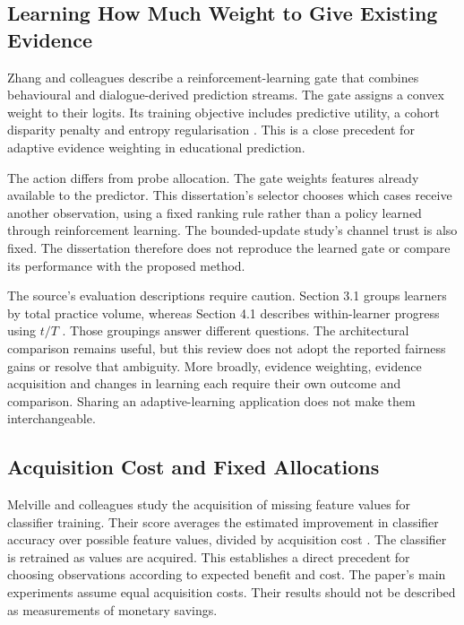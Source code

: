 \subsection{Learning How Much Weight to Give Existing Evidence}

Zhang and colleagues describe a reinforcement-learning gate that combines behavioural and dialogue-derived prediction
streams. The gate assigns a convex weight to their logits. Its training objective includes predictive utility, a cohort
disparity penalty and entropy regularisation \parencite[Sections 3.2--3.4]{zhang2026fusion}. This is a close precedent for
adaptive evidence weighting in educational prediction.

The action differs from probe allocation. The gate weights features already available to the predictor. This dissertation's selector chooses which
cases receive another observation, using a fixed ranking rule rather than a policy learned through reinforcement learning.
The bounded-update study's channel trust is also fixed. The dissertation therefore does not reproduce the learned gate or compare its performance
with the proposed method.

The source's evaluation descriptions require caution. Section 3.1 groups learners by total practice volume, whereas
Section 4.1 describes within-learner progress using $t/T$ \parencite{zhang2026fusion}. Those groupings answer different
questions. The architectural comparison remains useful, but this review does not adopt the reported fairness gains or
resolve that ambiguity. More broadly, evidence weighting, evidence acquisition and changes in learning each require their
own outcome and comparison. Sharing an adaptive-learning application does not make them interchangeable.

\subsection{Acquisition Cost and Fixed Allocations}

Melville and colleagues study the acquisition of missing feature values for classifier training. Their score averages the
estimated improvement in classifier accuracy over possible feature values, divided by acquisition cost
\parencite[Section 2, equations 1--2]{melville2005acquisition}. The classifier is retrained as values are acquired.
This establishes a direct precedent for choosing observations according to expected benefit and cost. The paper's main
experiments assume equal acquisition costs. Their results should not be described as measurements of monetary savings.

